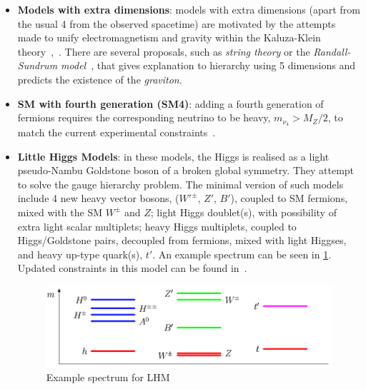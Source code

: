 \begin{itemize}
\item \textbf{Models with extra dimensions}: models with extra dimensions (apart from the usual 4 from the observed spacetime) are motivated by the attempts made to unify electromagnetism and gravity within the Kaluza-Klein theory~\cite{Kaluza},~\cite{Klein}. There are several proposals, such as \textit{string theory} or the \textit{Randall-Sundrum model}~\cite{RS}, that gives explanation to hierarchy using 5 dimensions and predicts the existence of the \textit{graviton}. 
\item \textbf{SM with fourth generation (SM4)}: adding a fourth generation of fermions requires the corresponding neutrino to be heavy, $m_{\nu_4} > M_Z/2$, to match the current experimental constraints~\cite{Lenz:2013iha}.   %
\item \textbf{Little Higgs Models}: in these models, the Higgs is realised as a light pseudo-Nambu Goldstone boson of a broken global symmetry. They attempt to solve the gauge hierarchy problem. The minimal version of such models include 4 new heavy vector bosons, ($W'^{\pm}$, $Z'$, $B'$), coupled to SM fermions, mixed with the SM $W^{\pm}$ and $Z$;  light Higgs doublet(s), with possibility of extra light scalar multiplets; heavy Higgs multiplets, coupled to Higgs/Goldstone pairs, decoupled from fermions, mixed with light Higgses, and heavy up-type quark(s), $t'$. An example spectrum can be seen in \ref{fig:lhm}. Updated constraints in this model can be found in~\cite{LHM}.
\begin{figure} [htb!]
\begin{center}
\includegraphics[scale=0.7]{figs/lhm.png}
\caption{Example spectrum for LHM  \label{fig:lhm}}
\end{center}
\end{figure}
\end{itemize}

